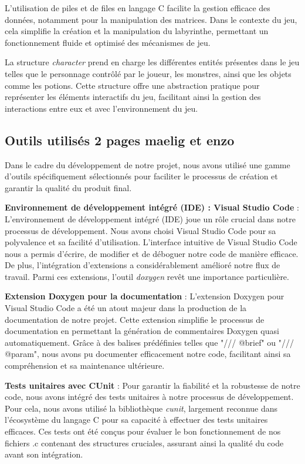 \documentclass[10pt]{article}
\begin{document}
L'utilisation de piles et de files en langage C facilite la gestion efficace des données, notamment pour la manipulation des matrices. Dans le contexte du jeu, cela simplifie la création et la manipulation du labyrinthe, permettant un fonctionnement fluide et optimisé des mécanismes de jeu.

La structure \textit{\gls{character}} prend en charge les différentes entités présentes dans le jeu telles que le personnage contrôlé par le joueur, les monstres, ainsi que les objets comme les potions. Cette structure offre une abstraction pratique pour représenter les éléments interactifs du jeu, facilitant ainsi la gestion des interactions entre eux et avec l'environnement du jeu.


\subsection{Outils utilisés 2 pages maelig et enzo}
Dans le cadre du développement de notre projet, nous avons utilisé une gamme d'outils spécifiquement sélectionnés pour faciliter le processus de création et garantir la qualité du produit final.

\textbf{Environnement de développement intégré (IDE) : Visual Studio Code} :
L'environnement de développement intégré (IDE) joue un rôle crucial dans notre processus de développement. Nous avons choisi Visual Studio Code pour sa polyvalence et sa facilité d'utilisation. L'interface intuitive de Visual Studio Code nous a permis d'écrire, de modifier et de déboguer notre code de manière efficace. De plus, l'intégration d'extensions a considérablement amélioré notre flux de travail. Parmi ces extensions, l'outil \textit{\gls{doxygen}} revêt une importance particulière.

\textbf{Extension Doxygen pour la documentation} :
L'extension Doxygen pour Visual Studio Code a été un atout majeur dans la production de la documentation de notre projet. Cette extension simplifie le processus de documentation en permettant la génération de commentaires Doxygen quasi automatiquement. Grâce à des balises prédéfinies telles que "/// @brief" ou "/// @param", nous avons pu documenter efficacement notre code, facilitant ainsi sa compréhension et sa maintenance ultérieure.

\textbf{Tests unitaires avec CUnit} :
Pour garantir la fiabilité et la robustesse de notre code, nous avons intégré des tests unitaires à notre processus de développement. Pour cela, nous avons utilisé la bibliothèque \textit{\gls{cunit}}, largement reconnue dans l'écosystème du langage C pour sa capacité à effectuer des tests unitaires efficaces. Ces tests ont été conçus pour évaluer le bon fonctionnement de nos fichiers .c contenant des structures cruciales, assurant ainsi la qualité du code avant son intégration.
\end{document}
